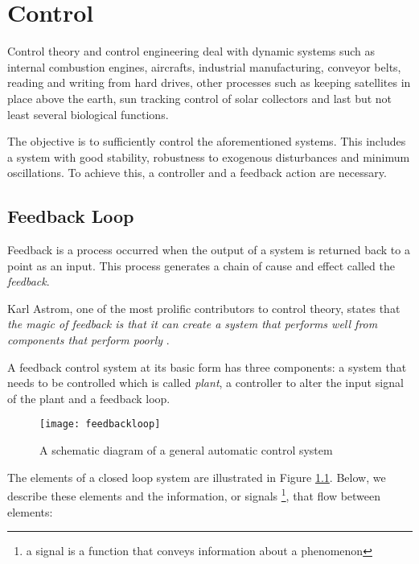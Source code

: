 \chapter{Control}\label{ch:3}

Control theory and control engineering deal with dynamic systems such as internal combustion engines, aircrafts, industrial manufacturing, conveyor belts, reading and writing from hard drives, other processes such as keeping satellites in place above the earth, sun tracking control of solar collectors and last but not least several biological functions. 

The objective is to sufficiently control the aforementioned systems. This includes a system with good stability, robustness to exogenous disturbances and minimum oscillations. To achieve this, a controller and a feedback action are necessary.


\section{Feedback Loop}
Feedback is a process occurred when the output of a system is returned back to a point as an input. This process generates a chain of cause and effect called the \textit{feedback}.

Karl Astrom, one of the most prolific contributors to control theory, states that \textit{the magic of feedback is that it can create a system that performs well from components that perform poorly}
\cite{aastrom2006challenges}.

A feedback control system at its basic form has three components: a system that needs to be controlled which is called \textit{plant}, a controller to alter the input signal of the plant and a feedback loop.

\begin{figure}[H]
    \centering
    \texttt{[image: feedbackloop]}
    \caption{A schematic diagram of a general automatic control system}
    \label{fig:feedback}
\end{figure}

The elements of a closed loop system are illustrated in Figure \ref{fig:feedback}. Below, we describe these elements and the information, or signals \footnote{a signal is a function that conveys information about a phenomenon}, that flow between elements:


